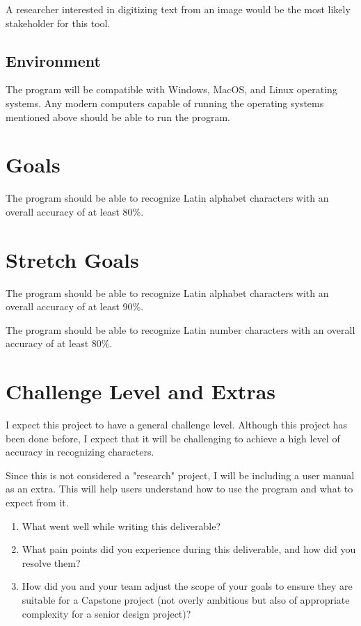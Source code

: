 \documentclass{article}
\begin{document}
A researcher interested in digitizing text from an image would be the most
likely stakeholder for this tool.

\subsection{Environment}

The program will be compatible with Windows, MacOS, and Linux operating systems.
Any modern computers capable of running the operating systems mentioned above
should be able to run the program.

\section{Goals}

The program should be able to recognize Latin alphabet characters with an
overall accuracy of at least 80\%.

\section{Stretch Goals}

The program should be able to recognize Latin alphabet characters with an
overall accuracy of at least 90\%.

The program should be able to recognize Latin number characters with an overall
accuracy of at least 80\%.

\section{Challenge Level and Extras}

I expect this project to have a general challenge level. Although this project
has been done before, I expect that it will be challenging to achieve a high
level of accuracy in recognizing characters.

Since this is not considered a "research" project, I will be including a user
manual as an extra. This will help users understand how to use the program and
what to expect from it.

\newpage{}

\begin{enumerate}
    \item What went well while writing this deliverable? 
    \item What pain points did you experience during this deliverable, and how
    did you resolve them?
    \item How did you and your team adjust the scope of your goals to ensure
    they are suitable for a Capstone project (not overly ambitious but also of
    appropriate complexity for a senior design project)?
\end{enumerate}  
\end{document}
